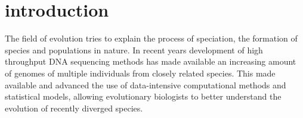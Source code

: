 \documentclass[10pt,a4paper]{article}
\begin{document}
\section{introduction}

The field of evolution tries to explain the process of speciation, the formation of species and populations in nature. In recent years  development of high throughput DNA sequencing methods has made available an increasing amount of genomes of multiple individuals from closely related species. This made available and advanced the use of data-intensive computational methods and statistical models, allowing evolutionary biologists to better understand the evolution of recently diverged species.
\end{document}
